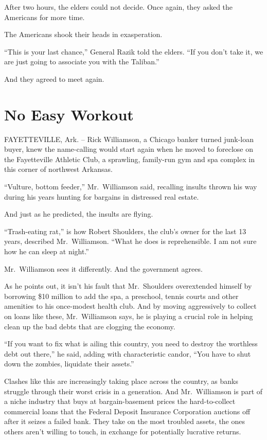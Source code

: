 \documentclass[12pt,a4paper,onecolumn]{article}
\begin{document}
After two hours, the elders could not decide. Once again, they asked the Americans for more time.

The Americans shook their heads in exasperation.

``This is your last chance,'' General Razik told the elders. ``If you don't take it, we are just
going to associate you with the Taliban.''

And they agreed to meet again.



\section{No Easy Workout}

FAYETTEVILLE, Ark. -- Rick Williamson, a Chicago banker turned junk-loan buyer, knew the
name-calling would start again when he moved to foreclose on the Fayetteville Athletic Club, a
sprawling, family-run gym and spa complex in this corner of northwest Arkansas.

``Vulture, bottom feeder,'' Mr.~Williamson said, recalling insults thrown his way during his years
hunting for bargains in distressed real estate.

And just as he predicted, the insults are flying.

``Trash-eating rat,'' is how Robert Shoulders, the club's owner for the last 13 years, described
Mr.~Williamson. ``What he does is reprehensible. I am not sure how he can sleep at night.''

Mr.~Williamson sees it differently. And the government agrees.

As he points out, it isn't his fault that Mr.~Shoulders overextended himself by borrowing \$10
million to add the spa, a preschool, tennis courts and other amenities to his once-modest health
club. And by moving aggressively to collect on loans like these, Mr.~Williamson says, he is playing
a crucial role in helping clean up the bad debts that are clogging the economy.

``If you want to fix what is ailing this country, you need to destroy the worthless debt out
there,'' he said, adding with characteristic candor, ``You have to shut down the zombies, liquidate
their assets.''

Clashes like this are increasingly taking place across the country, as banks struggle through their
worst crisis in a generation. And Mr.~Williamson is part of a niche industry that buys at
bargain-basement prices the hard-to-collect commercial loans that the Federal Deposit Insurance
Corporation auctions off after it seizes a failed bank. They take on the most troubled assets, the
ones others aren't willing to touch, in exchange for potentially lucrative returns.
\end{document}
